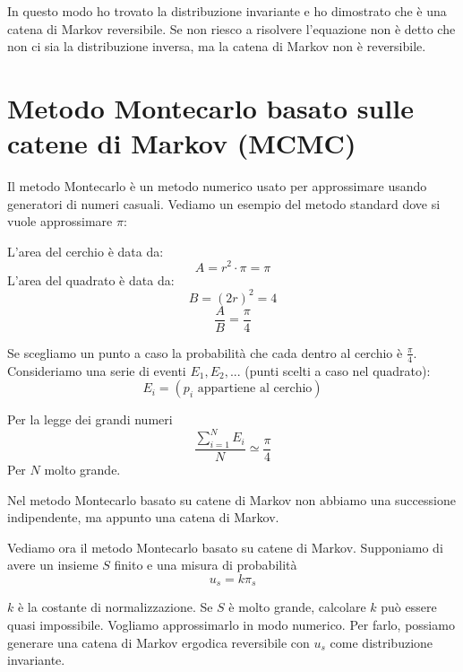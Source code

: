 \documentclass[a4paper,12pt]{book}
\newcommand\ddfrac[2]{\frac{\displaystyle #1}{\displaystyle #2}}
\begin{document}
In questo modo ho trovato la distribuzione invariante e ho dimostrato che è una catena di Markov reversibile. Se non riesco a risolvere l'equazione non è detto che non ci sia la distribuzione inversa, ma la catena di Markov non è reversibile. 

\section{Metodo Montecarlo basato sulle catene di Markov (MCMC)}
Il metodo Montecarlo è un metodo numerico usato per approssimare usando generatori di numeri casuali. Vediamo un esempio del metodo standard dove si vuole approssimare $\pi$:
\begin{multicols}{2}
	
	L'area del cerchio è data da:
	$$ A = r^2\cdot \pi = \pi $$
	L'area del quadrato è data da:
	$$ B = (2r)^2 = 4 $$
	$$ \ddfrac{A}{B} = \frac{\pi}{4}$$
	
\end{multicols}

Se scegliamo un punto a caso la probabilità che cada dentro al cerchio è $\frac{\pi}{4}$. Consideriamo una serie di eventi $ E_1, E_2, ... $ (punti scelti a caso nel quadrato):
$$ E_i = (p_i \text{ appartiene al cerchio})$$

Per la legge dei grandi numeri
$$ \ddfrac{\sum_{i=1}^{N} E_i}{N} \simeq \ddfrac{\pi}{4} $$
Per $ N $ molto grande. 

Nel metodo Montecarlo basato su catene di Markov non abbiamo una successione indipendente, ma appunto una catena di Markov. 

Vediamo ora il metodo Montecarlo basato su catene di Markov. Supponiamo di avere un insieme $ S $ finito e una misura di probabilità 
$$ u_s = k\pi_s $$

$ k $ è la costante di normalizzazione. Se $ S $ è molto grande, calcolare $ k $ può essere quasi impossibile. Vogliamo approssimarlo in modo numerico. Per farlo, possiamo generare una catena di Markov ergodica reversibile con $ u_s $ come distribuzione invariante. 
\end{document}
